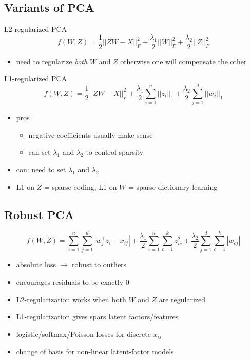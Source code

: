 \documentclass[10pt,landscape,a4paper]{article}
\begin{document}
\begin{multicols*}{5}
\subsection{Variants of PCA}
L2-regularized PCA
\begin{dmath*}
    f(W,Z) = \frac{1}{2} ||ZW-X||_F^2 + \frac{\lambda_1}{2} ||W||_F^2 + \frac{\lambda_2}{2} ||Z||_F^2
\end{dmath*}
\begin{itemize}
    \item need to regularize \emph{both} \(W\) and \(Z\) otherwise one will compensate the other
\end{itemize}
L1-regularized PCA
\begin{dmath*}
    f(W,Z) = \frac{1}{2} ||ZW-X||_F^2 + \frac{\lambda_1}{2} \sum_{i=1}^{n} ||z_i||_1 + \frac{\lambda_2}{2} \sum_{j=1}^{d} ||w_j||_1
\end{dmath*}
\begin{itemize}
    \item pros
    \begin{itemize}
        \item negative coefficients usually make sense
        \item can set \(\lambda_1\) and \(\lambda_2\) to control sparsity
    \end{itemize}
    \item con: need to set \(\lambda_1\) and \(\lambda_2\)
    \item L1 on \(Z\) = sparse coding, L1 on \(W\) = sparse dictionary learning
\end{itemize}

\subsection{Robust PCA}
\begin{dmath*}
    f(W,Z) = \sum\limits_{i=1}^{n} \sum\limits_{j=1}^{d} |w_j^\intercal z_i - x_{ij}| + \frac{\lambda_1}{2} \sum\limits_{i=1}^{n} \sum\limits_{c=1}^{k} z_{ic}^2 + \frac{\lambda_2}{2} \sum\limits_{j=1}^{d} \sum\limits_{c=1}^{k} |w_{cj}|
\end{dmath*}
\begin{itemize}
    \item absolute loss \(\rightarrow \) robust to outliers
    \item encourages residuals to be exactly 0
    \item L2-regularization works when both \(W\) and \(Z\) are regularized
    \item L1-regularization gives spars latent factors/features
    \item logistic/softmax/Poisson losses for discrete \(x_{ij}\)
    \item change of basis for non-linear latent-factor models
\end{itemize}


\end{multicols*}
\end{document}

